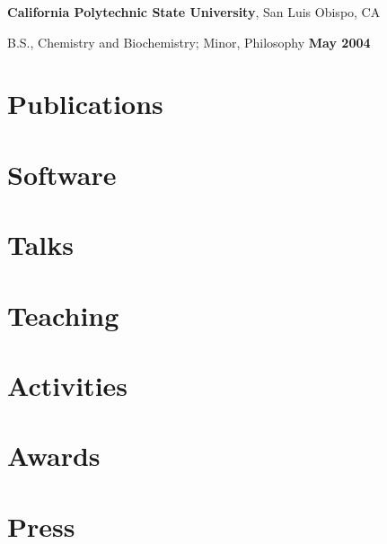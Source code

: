 \documentclass[margin,line]{res}
\newenvironment{list1}{
  \begin{list}{\ding{113}}{%
      \setlength{\itemsep}{0in}
      \setlength{\parsep}{0in} \setlength{\parskip}{0in}
      \setlength{\topsep}{0in} \setlength{\partopsep}{0in}
      \setlength{\leftmargin}{0.17in}}}{\end{list}}
\begin{document}
\begin{resume}
{\bf California Polytechnic State University}, San Luis Obispo, CA\\
\vspace*{-.1in}
\begin{list1}
\item[] B.S., Chemistry and Biochemistry; Minor, Philosophy \hfill {\bf May 2004}
\end{list1}

\section{\sc Publications}




\section{\sc Software}



\section{\sc Talks}



\section{\sc Teaching}



\section{\sc Activities}




\section{\sc Awards}



\section{\sc Press}



\end{resume}
\end{document}
